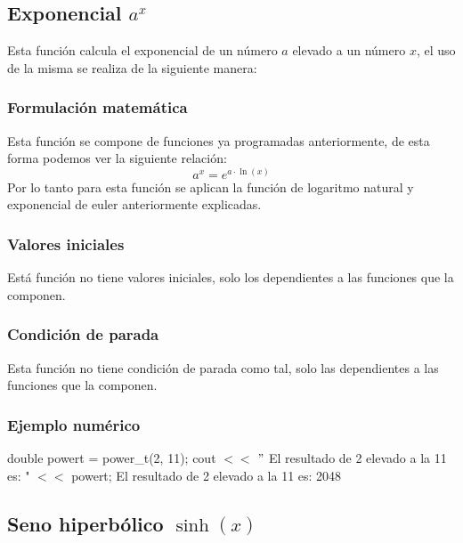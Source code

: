 \documentclass[10pt,a4paper]{article}
\begin{document}
	\subsection{Exponencial $a^{x}$}
	
	Esta función calcula el exponencial de un número $a$ elevado a un número $x$, el uso de la misma se realiza de la siguiente manera:
	
	\begin{center}
	\end{center}
	
	\subsubsection{Formulación matemática}
	Esta función se compone de funciones ya programadas anteriormente, de esta forma podemos ver la siguiente relación:
	\begin{equation}\label{key13}
		a^{x} = e^{a \cdot \ln(x)}
	\end{equation}
	Por lo tanto para esta función se aplican la función de logaritmo natural y exponencial de euler anteriormente explicadas.
	
	\subsubsection{Valores iniciales}
	
	Está función no tiene valores iniciales, solo los dependientes a las funciones que la componen.		

	\subsubsection{Condición de parada}

	Esta función no tiene condición de parada como tal, solo las dependientes a las funciones que la componen.
	
	\subsubsection{Ejemplo numérico}

	double powert = power{\_}t(2, 11); \newline
	cout $<<$ $"$ El resultado de 2 elevado a la 11 es: " $<<$ powert; \newline
	El resultado de 2 elevado a la 11 es: 2048\newline
	
	\subsection{Seno hiperbólico $\sinh(x)$}
	
\end{document}
